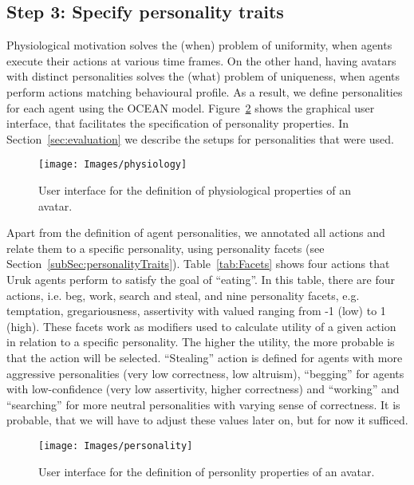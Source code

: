 \subsection{Step 3: Specify personality traits}

Physiological motivation solves the (when) problem of uniformity, when agents execute their actions at various time frames. On the other hand, having avatars with distinct personalities solves the (what) problem of uniqueness, when agents perform actions matching behavioural profile. As a result, we define personalities for each agent using the OCEAN model. Figure~\ref{fig:personality} shows the graphical user interface, that facilitates the specification of personality properties. In Section~\ref{sec:evaluation} we describe the setups for personalities that were used. 

\begin{figure}[!ht]
    \texttt{[image: Images/physiology]}
    \caption{User interface for the definition of physiological properties of an avatar.}
    \label{fig:physiology}
\end{figure}%


Apart from the definition of agent personalities, we annotated all actions and relate them to a specific personality, using personality facets (see Section~\ref{subSec:personalityTraits}). Table~\ref{tab:Facets} shows four actions that Uruk agents perform to satisfy the goal of ``eating''. In this table, there are four actions, i.e. beg, work, search and steal, and nine personality facets, e.g. temptation, gregariousness, assertivity with valued ranging from -1 (low) to 1 (high). These facets work as modifiers used to calculate utility of a given action in relation to a specific personality. The higher the utility, the more probable is that the action will be selected. ``Stealing'' action is defined for agents with more aggressive personalities (very low correctness, low altruism), ``begging'' for agents with low-confidence (very low assertivity, higher correctness) and ``working'' and ``searching'' for more neutral personalities with varying sense of correctness. It is probable, that we will have to adjust these values later on, but for now it sufficed.

\begin{figure}[!ht]
    \centering
    \texttt{[image: Images/personality]}
    \caption{User interface for the definition of personlity properties of an avatar.}
    \label{fig:personality}
\end{figure}%

